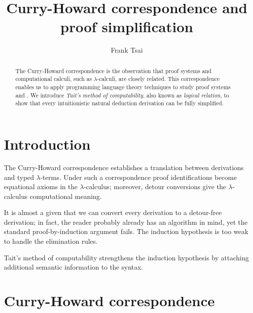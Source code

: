 \documentclass[a4paper]{article}
\title{Curry-Howard correspondence and proof simplification}
\author{Frank Tsai}
\begin{document}
\maketitle

\begin{abstract}
  The Curry-Howard correspondence is the observation that proof systems and computational calculi, such as $\lambda$-calculi, are closely related.
  This correspondence enables us to apply programming language theory techniques to study proof systems and \viceversa.
  We introduce \emph{Tait's method of computability}, also known as \emph{logical relation}, to show that every intuitionistic natural deduction derivation can be fully simplified.
\end{abstract}

\section{Introduction}
\label{sec:0000}


The Curry-Howard correspondence establishes a translation between derivations and typed $\lambda$-terms.
Under such a correspondence proof identifications become equational axioms in the $\lambda$-calculus; moreover, detour conversions give the $\lambda$-calculus computational meaning.

It is almost a given that we can convert every derivation to a detour-free derivation; in fact, the reader probably already has an algorithm in mind, yet the standard proof-by-induction argument fails.
The induction hypothesis is too weak to handle the elimination rules.

Tait's method of computability strengthens the induction hypothesis by attaching additional semantic information to the syntax.


\section{Curry-Howard correspondence}
\label{sec:0001}
\end{document}
